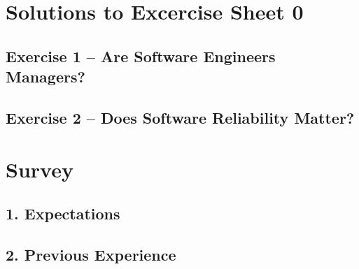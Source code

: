 \documentclass{scrartcl}
\begin{document}
\section*{Solutions to Excercise Sheet 0}

\subsection*{Exercise 1 – Are Software Engineers Managers?}

\subsection*{Exercise 2 – Does Software Reliability Matter?}


\section*{Survey}

\subsection*{1. Expectations}

\subsection*{2. Previous Experience}
\end{document}
